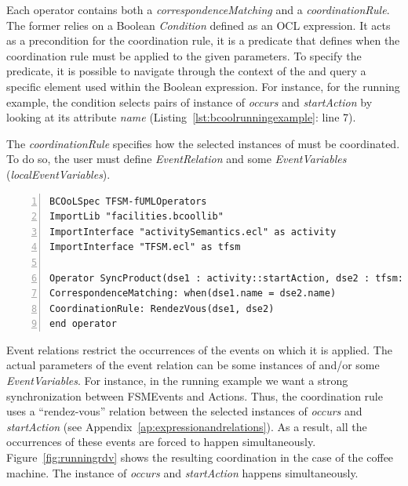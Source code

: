 Each operator contains both a \emph{correspondenceMatching} and a \emph{coordinationRule}. The former relies on a Boolean \emph{Condition} defined as an OCL expression. It acts as a precondition for the coordination rule, \ie it is a predicate that defines when the coordination rule must be applied to the given parameters. To specify the predicate, it is possible to navigate through the context of the \dse and query a specific element used within the Boolean expression. For instance, for the running example, the condition selects pairs of instance of \dse \emph{occurs} and \emph{startAction} by looking at its attribute \emph{name} (Listing~\ref{lst:bcoolrunningexample}: line 7). %

The \emph{coordinationRule} specifies how the selected instances of \dse must be coordinated. To do so, the user must define \emph{EventRelation} and some \emph{EventVariables} (\emph{localEventVariables}).

\begin{lstlisting}[language=bcool,
caption={Synchronized product operator between the TFSM and Activity languages},
label={lst:bcoolrunningexample}, 
basicstyle=\scriptsize\ttfamily, backgroundcolor=\color{LGrey}, numbers=left, xleftmargin=2pt]
BCOoLSpec TFSM-fUMLOperators
ImportLib "facilities.bcoollib"
ImportInterface "activitySemantics.ecl" as activity
ImportInterface "TFSM.ecl" as tfsm

Operator SyncProduct(dse1 : activity::startAction, dse2 : tfsm::occurs)
CorrespondenceMatching: when(dse1.name = dse2.name)
CoordinationRule: RendezVous(dse1, dse2)
end operator
\end{lstlisting}

Event relations restrict the occurrences of the events on which it is applied. The actual parameters of the event relation can be some instances of \dse and/or some \emph{EventVariables}. For instance, in the running example we want a strong synchronization between FSMEvents and Actions. Thus, the coordination rule uses a ``rendez-vous'' relation between the selected instances of \dse \emph{occurs} and \emph{startAction} (see Appendix~\ref{ap:expressionandrelations}). As a result, all the occurrences of these events are forced to happen simultaneously. Figure~\ref{fig:runningrdv} shows the resulting coordination in the case of the coffee machine. The instance of \dse \emph{occurs} and \emph{startAction} happens simultaneously.

